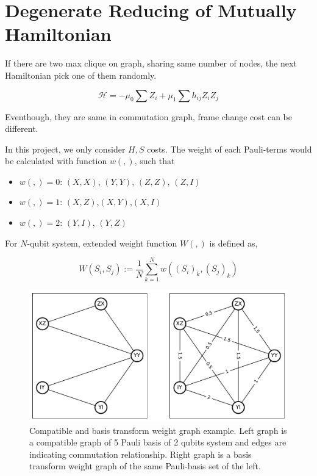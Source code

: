 \documentclass[
11pt,notheorems,hyperref={pdfauthor=Hyunseong Kim}
]{beamer}
\begin{document}
\section{Degenerate Reducing of Mutually Hamiltonian}

\begin{frame}
    If there are two max clique on graph, sharing same number of nodes, the next Hamiltonian pick one of them randomly.

    \begin{equation}
        \mathcal{H} = - \mu_0 \sum Z_i + \mu_1 \sum h_{ij} Z_i Z_j
    \end{equation}

    Eventhough, they are same in commutation graph, frame change cost can be different. 

    In this project, we only consider $H, S$ costs. 
    The weight of each Pauli-terms would be calculated with function $w(,)$, such that

    \begin{itemize}
        \item $w(,) = 0$: $(X,X)$, $(Y,Y)$, $(Z,Z)$, $(Z,I)$
        \item $w(,) = 1$: $(X,Z)$,$(X,Y)$,$(X,I)$
        \item $w(,) = 2$: $(Y,I)$, $(Y,Z)$
    \end{itemize}

For $N$-qubit system, extended weight function $W(,)$ is defined as,

\begin{equation}
    \label{eq:Weight}
   W(S_i, S_j) :=  \frac{1}{N} \sum_{k=1}^N w((S_{i})_k, (S_{j})_k)
\end{equation}
\end{frame}


\begin{frame}
    \begin{figure}
        \includegraphics[scale=0.7]{degenerate.pdf}
        \caption{Compatible and basis transform weight graph example. Left graph is a compatible graph of 5 Pauli basis of 2 qubits system and edges are indicating commutation relationship. Right graph is a basis transform weight graph of the same Pauli-basis set of the left.}
    \label{fig:graph}
    \end{figure}
\end{frame}
\end{document}
